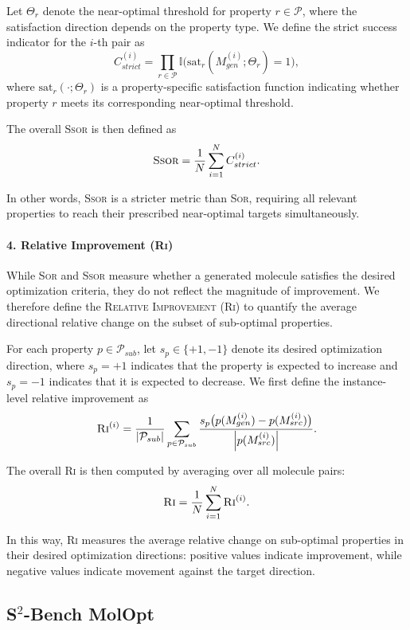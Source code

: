\documentclass[11pt]{article}
\begin{document}
Let $\Theta_r$ denote the near-optimal threshold for property $r \in \mathcal{P}$, where the satisfaction direction depends on the property type. We define the strict success indicator for the $i$-th pair as
\[
    C_{strict}^{(i)} = \prod_{r \in \mathcal{P}} \mathbb{I}\bigl( \mathrm{sat}_r(M_{gen}^{(i)}; \Theta_r) = 1 \bigr),
\]
where $\mathrm{sat}_r(\cdot;\Theta_r)$ is a property-specific satisfaction function indicating whether property $r$ meets its corresponding near-optimal threshold.

The overall \textsc{Ssor} is then defined as
\[
    \textsc{Ssor} = \frac{1}{N} \sum_{i=1}^N C_{strict}^{(i)}.
\]

In other words, \textsc{Ssor} is a stricter metric than \textsc{Sor}, requiring all relevant properties to reach their prescribed near-optimal targets simultaneously.



\paragraph{4. Relative Improvement (\textsc{Ri})}
While \textsc{Sor} and \textsc{Ssor} measure whether a generated molecule satisfies the desired optimization criteria, they do not reflect the magnitude of improvement. We therefore define the \textsc{Relative Improvement} (\textsc{Ri}) to quantify the average directional relative change on the subset of sub-optimal properties.

For each property $p \in \mathcal{P}_{sub}$, let $s_p \in \{+1,-1\}$ denote its desired optimization direction, where $s_p=+1$ indicates that the property is expected to increase and $s_p=-1$ indicates that it is expected to decrease. We first define the instance-level relative improvement as
\[
\textsc{Ri}^{(i)}
=
\frac{1}{|\mathcal{P}_{sub}|}
\sum_{p \in \mathcal{P}_{sub}}
\frac{
s_p \bigl(p(M_{gen}^{(i)}) - p(M_{src}^{(i)})\bigr)
}{
\left|p(M_{src}^{(i)})\right|
}.
\]

The overall \textsc{Ri} is then computed by averaging over all molecule pairs:
\[
\textsc{Ri}
=
\frac{1}{N}\sum_{i=1}^{N}\textsc{Ri}^{(i)}.
\]

In this way, \textsc{Ri} measures the average relative change on sub-optimal properties in their desired optimization directions: positive values indicate improvement, while negative values indicate movement against the target direction.

\subsection{S$^2$-Bench MolOpt}
\label{appendix:s2bench}
\end{document}

